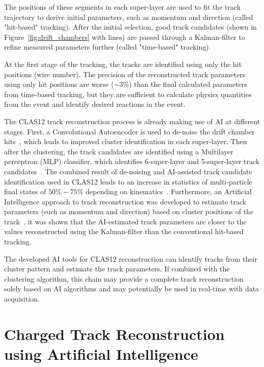 \documentclass[preprint,12pt]{elsarticle}
\begin{document}
The positions of these segments in each super-layer are used to fit the track trajectory 
to derive initial parameters, such as momentum and direction (called "hit-based" tracking).  After the initial selection, good track candidates 
(shown in Figure~\ref{fig:drift_chambers} with lines) are passed through a Kalman-filter to 
refine measured parameters further (called "time-based" tracking).

At the first stage of the tracking, the tracks are identified using only the hit positions (wire number). The precision 
of the reconstructed track parameters using only hit positions are worse ($\sim3\%$) than the final calculated parameters from time-based tracking, but they are sufficient to calculate physics quantities from the event and identify desired reactions in the event. 

The CLAS12 track reconstruction process is already making use of AI at different stages.
First, a Convolutional
Autoencoder is used to de-noise the drift chamber hits~\cite{Thomadakis:2022zcd}, which leads to improved cluster
identification in each super-layer. Then after the clustering, the track candidates are identified using a Multilayer perceptron (MLP) classifier,
which identifies 6-super-layer and 5-super-layer track candidates~\cite{Gavalian:2020oxg}. The combined result of
de-noising and AI-assisted track candidate identification used in CLAS12 leads to an increase in statistics of multi-particle 
final states of $50\%-75\%$ depending on kinematics~\cite{Gavalian:2020xmc}. 
Furthermore, an Artificial Intelligence approach to track reconstruction was developed to estimate track parameters 
(such as momentum and direction) based on cluster positions of the track~\cite{Thomadakis:2023ebe}, it was shown that 
the AI-estimated track parameters are closer to the values reconstructed using the Kalman-filter than the 
conventional hit-based tracking.

The developed AI tools for CLAS12 reconstruction can identify tracks from their cluster pattern and estimate the track parameters.
If combined with the clustering algorithm, this chain may provide a complete track reconstruction solely based on AI algorithms and
may potentially be used in real-time with data acquisition. 

%
%

\section{Charged Track Reconstruction using Artificial Intelligence}
\end{document}
